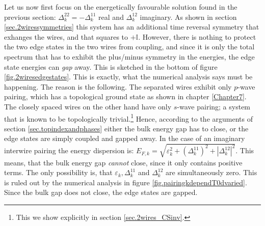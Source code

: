 Let us now first focus on the energetically favourable solution found in the previous section: $\Delta^{22}_k = - \Delta^{11}_k$ real and $\Delta^{12}_k$ imaginary. As shown in section \ref{sec.2wiressymmetries} this system has an additional time reversal symmetry that exhanges the wires, and that squares to $+\mathbb{I}$. However, there is nothing to protect the two edge states in the two wires from coupling, and since it is only the total spectrum that has to exhibit the plus/minus symmetry in the energies, the edge state energies can \textit{gap} away. This is sketched in the bottom of figure \ref{fig.2wiresedgestates}. This is exactly, what the numerical analysis says must be happening. The reason is the following. The separated wires exhibit only $p$-wave pairing, which has a topological ground state as shown in chapter \ref{Chapter7}. The closely spaced wires on the other hand have only $s$-wave pairing; a system that is known to be topologically trivial.\footnote{This we show explicitly in section \ref{sec.2wires_CSinv}.} Hence, according to the arguments of section \ref{sec.topindexandphases} either the bulk energy gap has to close, or the edge states are simply coupled and gapped away. In the case of an imaginary interwire pairing the energy dispersion is: $E_{F,k} = \sqrt{\varepsilon^2_k + (\Delta^{11}_k)^2 + |\Delta^{12}_k|^2 }$. This means, that the bulk energy gap \textit{cannot} close, since it only contains positive terms. The only possibility is, that $\varepsilon_k, \Delta^{11}_k$ and $\Delta^{12}_k$ are simultaneously zero. This is ruled out by the numerical analysis in figure \ref{fig.pairingkdependT0dvaried}. Since the bulk gap does not close, the edge states are gapped.

